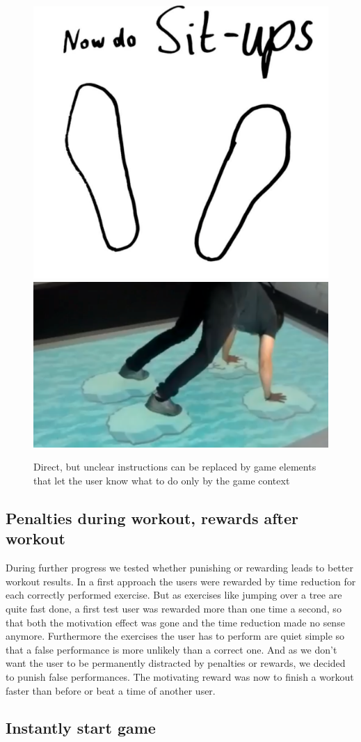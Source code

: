 \documentclass{sigchi}
\begin{document}
  \begin{figure}[htb]
    \centering
    \includegraphics[width=0.32\linewidth]{Image_20}
    \includegraphics[width=0.53\linewidth]{Image_21}
    \caption{Direct, but unclear instructions can be replaced by game elements that let the user know what to do only by the game context}
    \label{fig:copy}
  \end{figure}

  \subsection{Penalties during workout, rewards after workout} %
  \label{sub:penalties_during_workout_rewards_after_workout}

    During further progress we tested whether punishing or rewarding leads to better workout results. In a first approach the users were rewarded by time reduction for each correctly performed exercise. But as exercises like jumping over a tree are quite fast done, a first test user was rewarded more than one time a second, so that both the motivation effect was gone and the time reduction made no sense anymore. Furthermore the exercises the user has to perform are quiet simple so that a false performance is more unlikely than a correct one. And as we don't want the user to be permanently distracted by penalties or rewards, we decided to punish false performances. The motivating reward was now to finish a workout faster than before or beat a time of another user.

  \subsection{Instantly start game } %
  \label{sub:instantly_start_game_}
\end{document}
